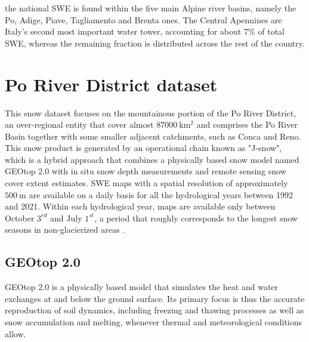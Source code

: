 the national SWE is found within the five main Alpine river basins, namely the Po, Adige, Piave, Tagliamento and Brenta ones. The Central Apennines are Italy's 
second most important water tower, accounting for about 7\% of total SWE, whereas the remaining fraction is distributed across the rest of the country. 












\section{Po River District dataset}
\label{sec:po_district}

This snow dataset focuses on the mountainous portion of the Po River District, an over-regional entity that cover almost $\SI{87000}{\kilo\meter\squared}$ and comprises 
the Po River Basin together with some smaller adjacent catchments, such as Conca and Reno. This snow product is generated by an operational chain known 
as "J-snow", which is a hybrid approach that combines a physically based snow model named GEOtop \num{2.0} with in situ snow depth measurements and 
remote sensing snow cover extent estimates. SWE maps with a spatial resolution of approximately $\SI{500}{\meter}$ are available on a daily basis for all the hydrological 
years between 1992 and 2021. Within each hydrological year, maps are available only between October $3^{rd}$ and July $1^{st}$, a period that roughly 
corresponds to the longest snow seasons in non-glacierized areas \parencite{Po_River_District_dataset}.

\subsection{GEOtop 2.0}

GEOtop 2.0 is a physically based model that simulates the heat and water exchanges at and below the ground surface. Its primary focus is thus the 
accurate reproduction of soil dynamics, including freezing and thawing processes as well as snow accumulation and melting, whenever thermal and 
meteorological conditions allow. 

